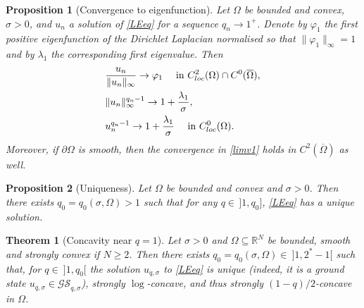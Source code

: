 \documentclass[10pt,a4paper]{amsart}
\newtheorem{proposition}{Proposition}
\newtheorem{theorem}{Theorem}
\newcommand{\R}{{\mathbb R}}
\renewcommand{\ge}{\geqslant}
\begin{document}
\begin{proposition}[Convergence to eigenfunction]
\label{prop_conv_eigenf}
Let $\Omega$ be bounded and convex, $\sigma>0$, and $u_n$ a solution of \eqref{LEeq} for a sequence $q_n\to 1^+$. 
Denote by $\varphi_1$ the first positive eigenfunction of the Dirichlet Laplacian normalised so that $\|\varphi_1\|_\infty=1$ and by $\lambda_1$ the corresponding first eigenvalue. 
Then 
\begin{align}
&\label{limv1}
\frac{u_{n}}{\|u_n\|_\infty} \to \varphi_1\quad \text{ in $C^2_{\rm loc}(\Omega)\cap C^0(\overline{\Omega})$},
\\&\label{limMq}
 \|u_n\|_\infty^{q_n-1} \to 1+\frac{\lambda_1}{\sigma},
\\& \label{limuq-1}
u_n^{q_n-1}\to 1+\frac{\lambda_1}{\sigma}\quad \text{ in $C^0_{{\rm loc}}
(\Omega)$}.
\end{align}
Moreover, if $\partial\Omega$ is smooth, then the convergence in \eqref{limv1} holds in $C^{2}(\overline{\Omega})$ as well.
\end{proposition}

\begin{proposition}[Uniqueness]
\label{corol_uniq}
Let $\Omega$ be bounded and convex and $\sigma>0$. 
Then there exists $q_0=q_0(\sigma, \Omega)>1$ such that for any $q\in \, ]1, q_0]$, \eqref{LEeq} has a unique solution.
\end{proposition}

\begin{theorem}[Concavity near $q=1$]
\label{thm_concav_gs}
Let $\sigma>0$ and $\Omega\subseteq \R^N$ be bounded, smooth and strongly convex if $N\ge 2$. 
Then there exists $q_0=q_0(\sigma, \Omega) \in\ ]1, 2^*-1[$ such that, for $q \in\ ]1, q_0[$ 
the solution $u_{q, \sigma}$ to \eqref{LEeq} is unique (indeed, it is a ground state $u_{q, \sigma} \in \mathcal{GS}_{q, \sigma}$), strongly $\log$-concave, and thus strongly $(1-q)/2$-concave in $\Omega$.
\end{theorem}
\end{document}
